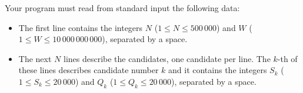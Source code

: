 Your program must read from standard input the following data:
\begin{itemize}
\item The first line contains the integers $N$ ($1 \le N \le 500\,000$) and $W$ ($1 \le W \le 10\,000\,000\,000$), separated by a space.
\item The next $N$ lines describe the candidates, one candidate per line. The $k$-th of these lines describes candidate number $k$ and it contains the integers $S_k$ ($1 \le S_k \le 20\,000$) and $Q_k$ ($1 \le Q_k \le 20\,000$), separated by a space.
\end{itemize}